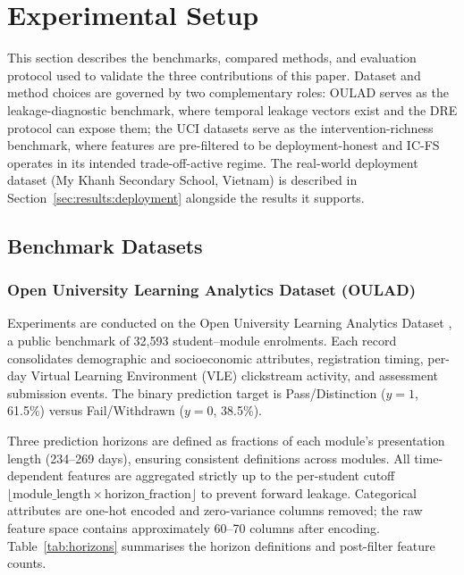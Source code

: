 \documentclass[a4paper,fleqn]{cas-sc}
\begin{document}
\section{Experimental Setup}
\label{sec:experiments}
 
This section describes the benchmarks, compared methods, and evaluation protocol used to validate the three contributions of this paper. Dataset and method choices are governed by two complementary roles: OULAD serves as the leakage-diagnostic benchmark, where temporal leakage vectors exist and the DRE protocol can expose them; the UCI datasets serve as the intervention-richness benchmark, where features are pre-filtered to be deployment-honest and IC-FS operates in
its intended trade-off-active regime.
The real-world deployment dataset (My Khanh Secondary School, Vietnam) is described in Section~\ref{sec:results:deployment} alongside the results it
supports.
 
\subsection{Benchmark Datasets}
\label{sec:exp:data}
 
\subsubsection{Open University Learning Analytics Dataset (OULAD)}
 
Experiments are conducted on the Open University Learning Analytics Dataset \citep[OULAD;][]{kuzilek2017}, a public benchmark of
32,593 student--module enrolments. Each record consolidates demographic and socioeconomic attributes, registration timing, per-day Virtual Learning Environment (VLE)
clickstream activity, and assessment submission events. The binary prediction target is Pass/Distinction ($y=1$, 61.5\%) versus Fail/Withdrawn ($y=0$, 38.5\%).
 
Three prediction horizons are defined as fractions of each module's presentation length (234--269 days), ensuring consistent definitions across modules.
All time-dependent features are aggregated strictly up to the per-student cutoff $\lfloor \text{module\_length} \times \text{horizon\_fraction} \rfloor$ to prevent forward leakage. Categorical attributes are one-hot encoded and zero-variance columns removed; the raw feature space contains approximately 60--70 columns after encoding. Table~\ref{tab:horizons} summarises the horizon definitions and post-filter feature counts.
 
\end{document}
